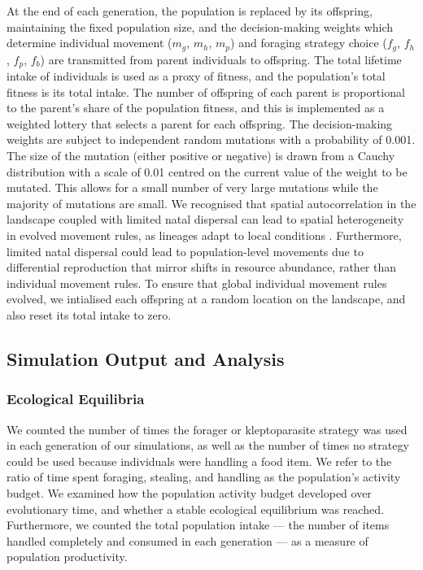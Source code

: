 \documentclass[11pt]{article}
\begin{document}
At the end of each generation, the population is replaced by its offspring, maintaining the fixed population size, and the decision-making weights which determine individual movement ($m_g$, $m_h$, $m_p$) and foraging strategy choice ($f_g$, $f_h$, $f_p$, $f_b$) are transmitted from parent individuals to offspring.
The total lifetime intake of individuals is used as a proxy of fitness, and the population's total fitness is its total intake.
The number of offspring of each parent is proportional to the parent's share of the population fitness, and this is implemented as a weighted lottery that selects a parent for each offspring.
The decision-making weights are subject to independent random mutations with a probability of 0.001.
The size of the mutation (either positive or negative) is drawn from a Cauchy distribution with a scale of 0.01 centred on the current value of the weight to be mutated.
This allows for a small number of very large mutations while the majority of mutations are small.
We recognised that spatial autocorrelation in the landscape coupled with limited natal dispersal can lead to spatial heterogeneity in evolved movement rules, as lineages adapt to local conditions \citep[][]{wolf2010}.
Furthermore, limited natal dispersal could lead to population-level movements due to differential reproduction that mirror shifts in resource abundance, rather than individual movement rules.
To ensure that global individual movement rules evolved, we intialised each offspring at a random location on the landscape, and also reset its total intake to zero.

\subsection{Simulation Output and Analysis}

\subsubsection{Ecological Equilibria}

We counted the number of times the forager or kleptoparasite strategy was used in each generation of our simulations, as well as the number of times no strategy could be used because individuals were handling a food item.
We refer to the ratio of time spent foraging, stealing, and handling as the population's activity budget.
We examined how the population activity budget developed over evolutionary time, and whether a stable ecological equilibrium was reached.
Furthermore, we counted the total population intake --- the number of items handled completely and consumed in each generation --- as a measure of population productivity.
\end{document}
